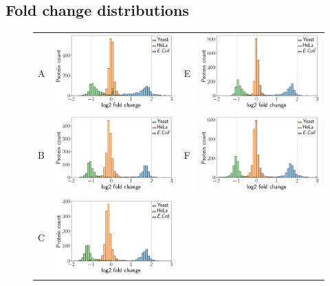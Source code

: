 \documentclass[11pt]{article}
\begin{document}
\subsection*{Fold change distributions}
\begin{figure}[hbt]
    \centering
    \begin{tabular}{lclc} 
        A & \includegraphics[width=0.4\linewidth]{../../result/report_plots_pipeline/histogram_ID_triqler.png} & 
        E & \includegraphics[width=0.4\linewidth]{../../result/report_plots_pipeline/histogram_PS_triqler.png} \\ 
        B & \includegraphics[width=0.4\linewidth]{../../result/report_plots_pipeline/histogram_ID_msqrob2.png} & 
        F & \includegraphics[width=0.4\linewidth]{../../result/report_plots_pipeline/histogram_PS_msqrob2.png} \\ 
        C & \includegraphics[width=0.4\linewidth]{../../result/report_plots_pipeline/histogram_ID_msstats.png} & 

\end{tabular}
\end{figure}
\end{document}
